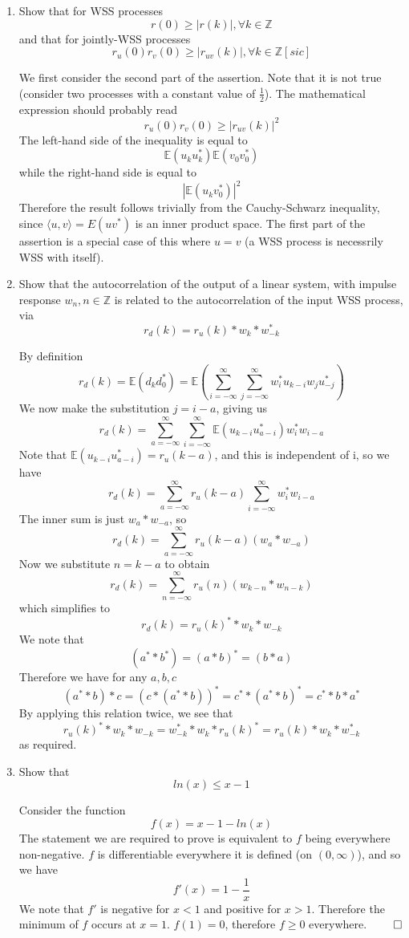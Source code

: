 \documentclass{article}
\newcommand{\chapternumber}{2}
\newenvironment{QandA}{\begin{enumerate}[label=\chapternumber.\arabic*]\bfseries\boldmath}
	{\end{enumerate}}
\newenvironment{answered}{\par\bigskip\normalfont\unboldmath}{}
\begin{document}
\begin{QandA}
	\item Show that for WSS processes
	\[r(0)\geq |r(k)|,\forall k\in \mathbb{Z}\]
	and that for jointly-WSS processes
	\[r_u(0)r_v(0)\geq|r_{uv}(k)|,\forall k\in \mathbb{Z}[sic]\]
	\begin{answered}
		We first consider the second part of the assertion. Note that it is not true (consider two processes with a constant value of $\frac{1}{2}$). The mathematical expression should probably read
		\[r_u(0)r_v(0)\geq|r_{uv}(k)|^2\]
		The left-hand side of the inequality is equal to
		\[\mathbb{E}(u_ku_k^*)\mathbb{E}(v_0v_0^*)\]
		while the right-hand side is equal to
		\[|\mathbb{E}(u_kv_0^*)|^2\]
		Therefore the result follows trivially from the Cauchy-Schwarz inequality, since $\langle u,v\rangle =E(uv^*)$ is an inner product space. The first part of the assertion is a special case of this where $u=v$ (a WSS process is necessrily WSS with itself).
		
	\end{answered}

	\item Show that the autocorrelation of the output of a linear system, with impulse response $w_n,n\in\mathbb{Z}$ is related to the autocorrelation of the input WSS process, via
	\[r_d(k)=r_u(k)* w_k* w^*_{-k}\]
	\begin{answered}
		By definition
		\[r_d(k)=\mathbb{E}(d_kd_0^*)=\mathbb{E}\left(\sum_{i=-\infty}^{\infty}\sum_{j=-\infty}^{\infty}w_i^*u_{k-i}w_ju_{-j}^*\right)\]
		We now make the substitution $j=i-a$, giving us
		\[r_d(k)=\sum_{a=-\infty}^{\infty}\sum_{i=-\infty}^{\infty}\mathbb{E}(u_{k-i}u_{a-i}^*)w_i^*w_{i-a}\]
		Note that $\mathbb{E}(u_{k-i}u_{a-i}^*)=r_u(k-a)$, and this is independent of i, so we have
		\[r_d(k)=\sum_{a=-\infty}^{\infty}r_u(k-a)\sum_{i=-\infty}^{\infty}w_i^*w_{i-a}\]
		The inner sum is just $w_a*w_{-a}$, so
		\[r_d(k)=\sum_{a=-\infty}^{\infty}r_u(k-a)(w_a*w_{-a})\]
		Now we substitute $n=k-a$ to obtain
		\[r_d(k)=\sum_{n=-\infty}^{\infty}r_u(n)(w_{k-n}*w_{n-k})\]
		which simplifies to
		\[r_d(k)=r_u
		(k)^**w_k*w_{-k}\]
		We note that 
		\[(a^**b^*)=(a*b)^*=(b*a)\]
		Therefore we have for any $a,b,c$
		\[(a^**b)*c=(c*(a^**b))^*=c^**(a^**b)^*=c^**b*a^*\]
		By applying this relation twice, we see that
		\[r_u
		(k)^**w_k*w_{-k}=w_{-k}^**w_k*r_u(k)^*=r_u
		(k)*w_k*w_{-k}^*\]
		as required.
	\end{answered}

	\item Show that 
	\[ln(x)\leq x-1\]
	\begin{answered}
		Consider the function \[f(x)=x-1-ln(x)\]The statement we are required to prove is equivalent to $f$ being everywhere non-negative. $f$ is differentiable everywhere it is defined (on $(0,\infty)$), and so we have
		\[f'(x)=1-\frac{1}{x}\]
		We note that $f'$ is negative for $x<1$ and positive for $x>1$. Therefore the minimum of $f$ occurs at $x=1$. $f(1)=0$, therefore $f\geq0$ everywhere. $\qed$		
	\end{answered}


\end{QandA}
\end{document}

